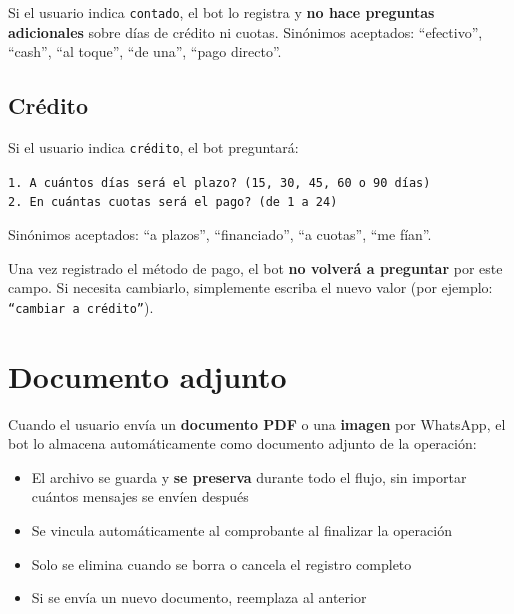 \documentclass[12pt,a4paper]{article}
\begin{document}
Si el usuario indica \texttt{contado}, el bot lo registra y \textbf{no hace preguntas adicionales} sobre d\'ias de cr\'edito ni cuotas. Sin\'onimos aceptados: ``efectivo'', ``cash'', ``al toque'', ``de una'', ``pago directo''.

\subsection{Cr\'edito}

Si el usuario indica \texttt{cr\'edito}, el bot preguntar\'a:

\begin{mensajebot}
\texttt{1. A cu\'antos d\'ias ser\'a el plazo? (15, 30, 45, 60 o 90 d\'ias)} \\
\texttt{2. En cu\'antas cuotas ser\'a el pago? (de 1 a 24)}
\end{mensajebot}

Sin\'onimos aceptados: ``a plazos'', ``financiado'', ``a cuotas'', ``me f\'ian''.

\begin{notaimportante}
Una vez registrado el m\'etodo de pago, el bot \textbf{no volver\'a a preguntar} por este campo. Si necesita cambiarlo, simplemente escriba el nuevo valor (por ejemplo: \texttt{``cambiar a cr\'edito''}).
\end{notaimportante}

\section{Documento adjunto}

Cuando el usuario env\'ia un \textbf{documento PDF} o una \textbf{imagen} por WhatsApp, el bot lo almacena autom\'aticamente como documento adjunto de la operaci\'on:

\begin{itemize}
    \item El archivo se guarda y \textbf{se preserva} durante todo el flujo, sin importar cu\'antos mensajes se env\'ien despu\'es
    \item Se vincula autom\'aticamente al comprobante al finalizar la operaci\'on
    \item Solo se elimina cuando se borra o cancela el registro completo
    \item Si se env\'ia un nuevo documento, reemplaza al anterior
\end{itemize}
\end{document}
